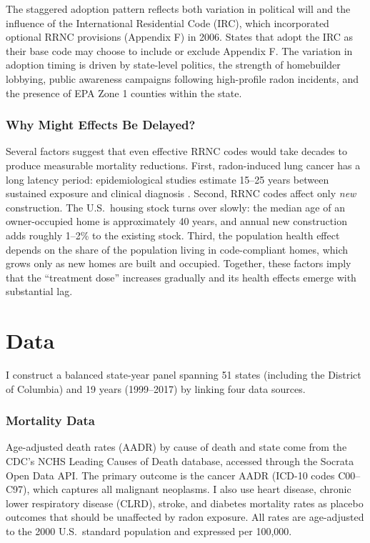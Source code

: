 \documentclass[12pt]{article}
\begin{document}
The staggered adoption pattern reflects both variation in political will and the influence of the International Residential Code (IRC), which incorporated optional RRNC provisions (Appendix F) in 2006. States that adopt the IRC as their base code may choose to include or exclude Appendix F. The variation in adoption timing is driven by state-level politics, the strength of homebuilder lobbying, public awareness campaigns following high-profile radon incidents, and the presence of EPA Zone 1 counties within the state.

\subsubsection*{Why Might Effects Be Delayed?} Several factors suggest that even effective RRNC codes would take decades to produce measurable mortality reductions. First, radon-induced lung cancer has a long latency period: epidemiological studies estimate 15--25 years between sustained exposure and clinical diagnosis \citep{darby2005radon}. Second, RRNC codes affect only \emph{new} construction. The U.S.\ housing stock turns over slowly: the median age of an owner-occupied home is approximately 40 years, and annual new construction adds roughly 1--2\% to the existing stock. Third, the population health effect depends on the share of the population living in code-compliant homes, which grows only as new homes are built and occupied. Together, these factors imply that the ``treatment dose'' increases gradually and its health effects emerge with substantial lag.


\section{Data}

I construct a balanced state-year panel spanning 51 states (including the District of Columbia) and 19 years (1999--2017) by linking four data sources.

\subsubsection*{Mortality Data} Age-adjusted death rates (AADR) by cause of death and state come from the CDC's NCHS Leading Causes of Death database, accessed through the Socrata Open Data API. The primary outcome is the cancer AADR (ICD-10 codes C00--C97), which captures all malignant neoplasms. I also use heart disease, chronic lower respiratory disease (CLRD), stroke, and diabetes mortality rates as placebo outcomes that should be unaffected by radon exposure. All rates are age-adjusted to the 2000 U.S.\ standard population and expressed per 100,000.
\end{document}

